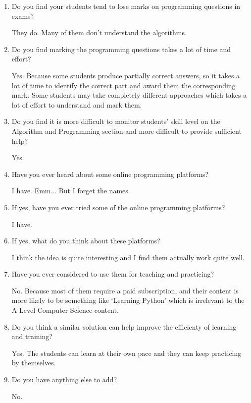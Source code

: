 \documentclass[a4paper]{report}
\begin{document}
\begin{enumerate}
    \item Do you find your students tend to lose marks on programming questions in exams?

          They do. Many of them don't understand the algorithms.

    \item Do you find marking the programming questions takes a lot of time and effort?

          Yes. Because some students produce partially correct answers, so it takes a lot of time to identify the correct part and award them the corresponding mark. Some students may take completely different approaches which takes a lot of effort to understand and mark them.

    \item Do you find it is more difficult to monitor students' skill level on the Algorithm and Programming section and more difficult to provide sufficient help?

          Yes.

    \item Have you ever heard about some online programming platforms?

          I have. Emm... But I forget the names.

    \item If yes, have you ever tried some of the online programming platforms?

          I have.

    \item If yes, what do you think about these platforms?

          I think the idea is quite interesting and I find them actually work quite well.

    \item Have you ever considered to use them for teaching and practicing?

          No. Because most of them require a paid subscription, and their content is more likely to be something like `Learning Python' which is irrelevant to the A Level Computer Science content.

    \item Do you think a similar solution can help improve the efficienty of learning and training?

          Yes. The students can learn at their own pace and they can keep practicing by themselves.

    \item Do you have anything else to add?

          No.
\end{enumerate}
\end{document}
